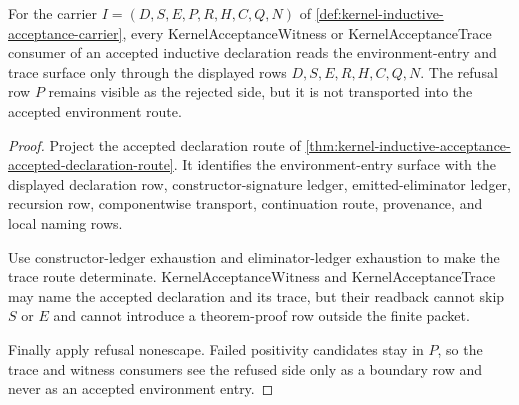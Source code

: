 \begin{theorem}
\label{thm:kernel-inductive-acceptance-environment-scope-route}
For the carrier $I=(D,S,E,P,R,H,C,Q,N)$ of \autoref{def:kernel-inductive-acceptance-carrier}, every KernelAcceptanceWitness or KernelAcceptanceTrace consumer of an accepted inductive declaration reads the environment-entry and trace surface only through the displayed rows $D,S,E,R,H,C,Q,N$. The refusal row $P$ remains visible as the rejected side, but it is not transported into the accepted environment route.
\end{theorem}
\begin{proof}
Project the accepted declaration route of \autoref{thm:kernel-inductive-acceptance-accepted-declaration-route}. It identifies the environment-entry surface with the displayed declaration row, constructor-signature ledger, emitted-eliminator ledger, recursion row, componentwise transport, continuation route, provenance, and local naming rows.

Use constructor-ledger exhaustion and eliminator-ledger exhaustion to make the trace route determinate. KernelAcceptanceWitness and KernelAcceptanceTrace may name the accepted declaration and its trace, but their readback cannot skip $S$ or $E$ and cannot introduce a theorem-proof row outside the finite packet.

Finally apply refusal nonescape. Failed positivity candidates stay in $P$, so the trace and witness consumers see the refused side only as a boundary row and never as an accepted environment entry.
\end{proof}

